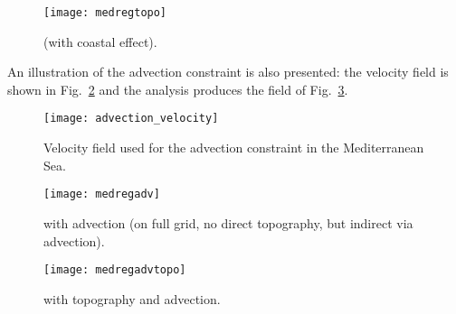 \begin{figure}[H]
\centering
\parbox{.6\textwidth}{
\texttt{[image: medregtopo]}
}\parbox{.4\textwidth}{
\caption{\diva (with coastal effect).\label{fig:medregtopo} }
}
\end{figure}

An illustration of the advection constraint  is also presented: the velocity field is shown in Fig.~\ref{fig:medsea_vel} and the analysis produces the field of Fig.~\ref{fig:medsea_adv}.

\begin{figure}[H]
\centering
\parbox{.6\textwidth}{
\texttt{[image: advection\_velocity]}
}\parbox{.4\textwidth}{
\caption{Velocity field used for the advection constraint in the Mediterranean Sea.\label{fig:medsea_vel}}
}
\end{figure}

\begin{figure}[H]
\centering
\parbox{.6\textwidth}{
\texttt{[image: medregadv]}
}\parbox{.4\textwidth}{
\caption{\diva with advection (on full grid, no direct topography, but indirect 
via advection).\label{fig:medsea_adv}}
}
\end{figure}


\begin{figure}[H]
\centering
\parbox{.6\textwidth}{
\texttt{[image: medregadvtopo]}
}\parbox{.4\textwidth}{
\caption{\diva with topography and advection.}
}
\end{figure}


